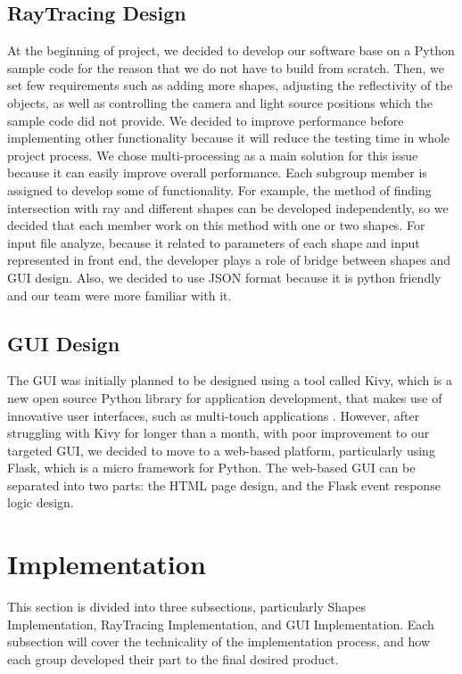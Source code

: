 \documentclass[a4paper, 12pt]{article}
\begin{document}
\subsection{RayTracing Design}
At the beginning of project, we decided to develop our software base on a Python sample code \cite{Very simple ray-tracing engine in (almost) pure Python} for the reason that we do not have to build from scratch. Then, we set few requirements such as adding more shapes, adjusting the reflectivity of the objects, as well as controlling the camera and light source positions which the sample code did not provide. We decided to improve performance before implementing other functionality because it will reduce the testing time in whole project process. We chose multi-processing as a main solution for this issue because it can easily improve overall performance. Each subgroup member is assigned to develop some of functionality. For example, the method of finding intersection with ray and different shapes can be developed independently, so we decided that each member work on this method with one or two shapes. For input file analyze, because it related to parameters of each shape and input represented in front end, the developer plays a role of bridge between shapes and GUI design. Also, we decided to use JSON format because it is python friendly and our team were more familiar with it.

\subsection{GUI Design}
The GUI was initially planned to be designed using a tool called Kivy, which is a new open source Python library for application development, that makes use of innovative user interfaces, such as multi-touch applications \cite{kivy}. However, after struggling with Kivy for longer than a month, with poor improvement to our targeted GUI, we decided to move to a web-based platform, particularly using Flask, which is a micro framework for Python. The web-based GUI can be separated into two parts: the HTML page design, and the Flask event response logic design.


\section{Implementation}
This section is divided into three subsections, particularly Shapes Implementation, RayTracing Implementation, and GUI Implementation. Each subsection will cover the technicality of the implementation process, and how each group developed their part to the final desired product.
\end{document}
